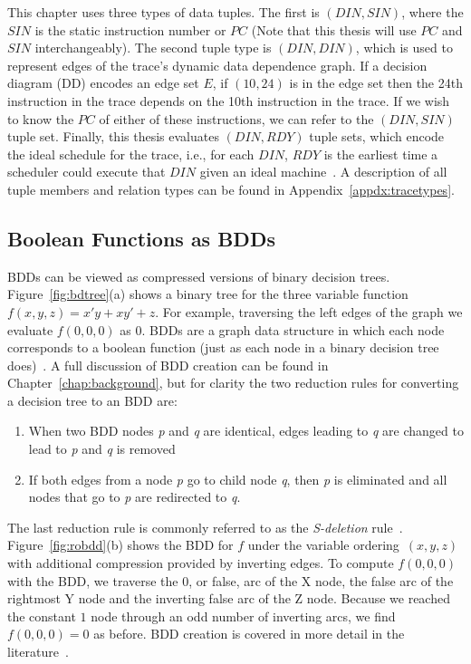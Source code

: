 \documentclass[defaultstyle,11pt]{thesis}
\begin{document}
This chapter uses three types of data tuples.  The first is
$(DIN,SIN)$, where the $SIN$ is the static instruction number or $PC$
(Note that this thesis will use $PC$ and $SIN$ interchangeably).  The
second tuple type is $(DIN,DIN)$, which is used to represent edges of
the trace's dynamic data dependence graph.  If a decision diagram (DD)
encodes an edge set $E$, if $(10,24)$ is in the edge set then the 24th
instruction in the trace depends on the 10th instruction in the trace.
If we wish to know the $PC$ of either of these instructions, we can
refer to the $(DIN,SIN)$ tuple set.  Finally, this thesis evaluates
$(DIN,RDY)$ tuple sets, which encode the ideal schedule for the trace,
i.e., for each $DIN$, $RDY$ is the earliest time a scheduler could
execute that $DIN$ given an ideal machine~\cite{price:08:pact}.  A
description of all tuple members and relation types can be found in
Appendix~\ref{appdx:tracetypes}.

\subsection{Boolean Functions as BDDs}

BDDs can be viewed as compressed versions of binary decision trees.
Figure~\ref{fig:bdtree}(a) shows a binary tree for the three variable
function $f(x,y,z) = x'y + xy' + z$.  For example, traversing the left
edges of the graph we evaluate $f(0,0,0)$ as $0$.  BDDs are a graph
data structure in which each node corresponds to a boolean function
(just as each node in a binary decision tree
does)~\cite{bryant:86:ieeetc}. A full discussion of BDD creation can
be found in Chapter~\ref{chap:background}, but for clarity the two
reduction rules for converting a decision tree to an BDD are:

\begin{enumerate}

\item When two BDD nodes \textit{p} and \textit{q} are identical, edges
  leading to \textit{q} are changed to lead to \textit{p} and \textit{q} is
  removed

\item If both edges from a node \textit{p} go to 
  child node \textit {q}, then \textit{p} is eliminated and all nodes that
  go to \textit{p} are redirected to \textit{q}.

\end{enumerate}

The last reduction rule is commonly referred to as the
\textit{S-deletion}
rule~\cite{minato:01:STTT}. Figure~\ref{fig:robdd}(b) shows the BDD
for $f$ under the variable ordering~$(x,y,z)$ with additional
compression provided by inverting edges. To compute $f(0,0,0)$ with
the BDD, we traverse the $0$, or false, arc of the X node, the false
arc of the rightmost Y node and the inverting false arc of the Z node.
Because we reached the constant $1$ node through an odd number of
inverting arcs, we find $f(0,0,0)=0$ as before. BDD creation is
covered in more detail in the
literature~\cite{somenzi:09:cu,bryant:86:ieeetc,price:06:cal}.
\end{document}
